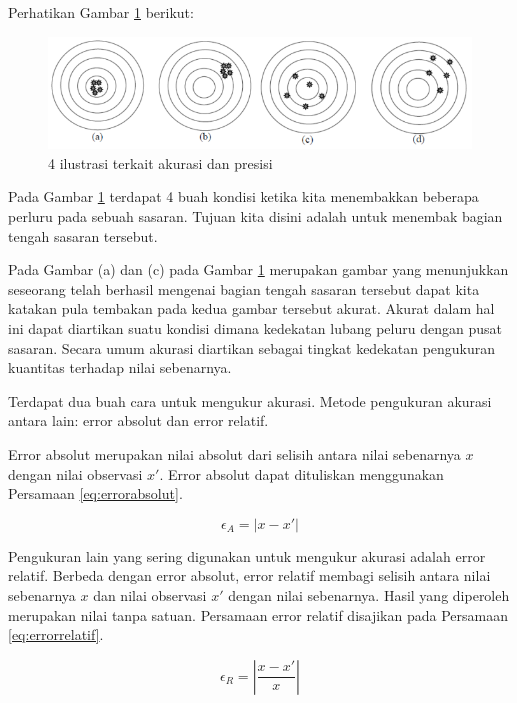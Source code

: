 \documentclass[
]{book}
\theoremstyle{definition}
\theoremstyle{definition}
\theoremstyle{definition}
\theoremstyle{definition}
\theoremstyle{remark}
\begin{document}
Perhatikan Gambar \ref{fig:akurasi} berikut:

\begin{figure}

{\centering \includegraphics[width=0.75\linewidth]{./images/akurasi} 

}

\caption{4 ilustrasi terkait akurasi dan presisi}\label{fig:akurasi}
\end{figure}

Pada Gambar \ref{fig:akurasi} terdapat 4 buah kondisi ketika kita menembakkan beberapa perluru pada sebuah sasaran. Tujuan kita disini adalah untuk menembak bagian tengah sasaran tersebut.

Pada Gambar (a) dan (c) pada Gambar \ref{fig:akurasi} merupakan gambar yang menunjukkan seseorang telah berhasil mengenai bagian tengah sasaran tersebut dapat kita katakan pula tembakan pada kedua gambar tersebut akurat. Akurat dalam hal ini dapat diartikan suatu kondisi dimana kedekatan lubang peluru dengan pusat sasaran. Secara umum akurasi diartikan sebagai tingkat kedekatan pengukuran kuantitas terhadap nilai sebenarnya.

Terdapat dua buah cara untuk mengukur akurasi. Metode pengukuran akurasi antara lain: error absolut dan error relatif.

Error absolut merupakan nilai absolut dari selisih antara nilai sebenarnya \(x\) dengan nilai observasi \(x'\). Error absolut dapat dituliskan menggunakan Persamaan \eqref{eq:errorabsolut}.

\begin{equation}
   \epsilon_A=\left|x-x'\right|
  \label{eq:errorabsolut}
\end{equation}

Pengukuran lain yang sering digunakan untuk mengukur akurasi adalah error relatif. Berbeda dengan error absolut, error relatif membagi selisih antara nilai sebenarnya \(x\) dan nilai observasi \(x'\) dengan nilai sebenarnya. Hasil yang diperoleh merupakan nilai tanpa satuan. Persamaan error relatif disajikan pada Persamaan \eqref{eq:errorrelatif}.

\begin{equation}
   \epsilon_R=\left|\frac{x-x'}{x}\right|
  \label{eq:errorrelatif}
\end{equation}
\end{document}
